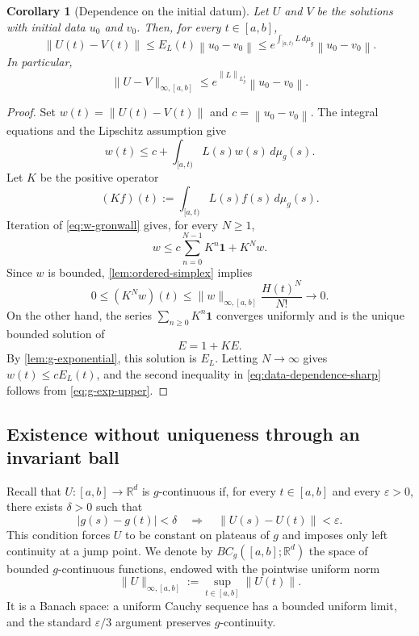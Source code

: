\documentclass[preprint,12pt]{elsarticle}
\newenvironment{finalrevision}{\begingroup\color{red}}{\endgroup}
\newenvironment{finalrevision}{}{}
\newtheorem{corollary}[theorem]{Corollary}
\theoremstyle{definition}
\theoremstyle{remark}
\newcommand{\R}{\mathbb R}
\newcommand{\norm}[1]{\left\lVert#1\right\rVert}
\begin{document}
\begin{corollary}[Dependence on the initial datum]\label{cor:data-dependence}
Let $U$ and $V$ be the solutions with initial data $u_0$ and $v_0$. Then, for every $t\in[a,b]$,
\begin{equation}\label{eq:data-dependence-sharp}
 \norm{U(t)-V(t)}
 \le E_L(t)\norm{u_0-v_0}
 \le e^{\int_{[a,t)}L\,d\mu_g}\norm{u_0-v_0}.
\end{equation}
In particular,
\[
 \|U-V\|_{\infty,[a,b]}
 \le e^{\norm{L}_{L_g^1}}\norm{u_0-v_0}.
\]
\end{corollary}

\begin{proof}
Set $w(t)=\norm{U(t)-V(t)}$ and $c=\norm{u_0-v_0}$. The integral equations and the Lipschitz assumption give
\begin{equation}\label{eq:w-gronwall}
 w(t)\le c+\int_{[a,t)}L(s)w(s)\,d\mu_g(s).
\end{equation}
Let $K$ be the positive operator
\[
 (Kf)(t):=\int_{[a,t)}L(s)f(s)\,d\mu_g(s).
\]
Iteration of \eqref{eq:w-gronwall} gives, for every $N\ge1$,
\[
 w\le c\sum_{n=0}^{N-1}K^n\mathbf1+K^Nw.
\]
Since $w$ is bounded, \cref{lem:ordered-simplex} implies
\[
 0\le(K^Nw)(t)
 \le\|w\|_{\infty,[a,b]}\frac{H(t)^N}{N!}\longrightarrow0.
\]
On the other hand, the series $\sum_{n\ge0}K^n\mathbf1$ converges uniformly and is the unique bounded solution of
\[
 E=1+KE.
\]
By \cref{lem:g-exponential}, this solution is $E_L$. Letting $N\to\infty$ gives $w(t)\le cE_L(t)$, and the second inequality in \eqref{eq:data-dependence-sharp} follows from \eqref{eq:g-exp-upper}.
\end{proof}

\subsection{Existence without uniqueness through an invariant ball}

Recall that $U:[a,b]\to\R^d$ is $g$-continuous if, for every $t\in[a,b]$ and every $\varepsilon>0$, there exists $\delta>0$ such that
\[
 |g(s)-g(t)|<\delta\quad\Longrightarrow\quad\norm{U(s)-U(t)}<\varepsilon.
\]
This condition forces $U$ to be constant on plateaus of $g$ and imposes only left continuity at a jump point.
\begin{finalrevision}
We denote by \(BC_g([a,b];\R^d)\) the space of bounded
\(g\)-continuous functions, endowed with the pointwise uniform norm
\[
 \|U\|_{\infty,[a,b]}:=\sup_{t\in[a,b]}\|U(t)\|.
\]
It is a Banach space: a uniform Cauchy sequence has a bounded uniform limit,
and the standard \(\varepsilon/3\) argument preserves \(g\)-continuity.
\end{finalrevision}
\end{document}
